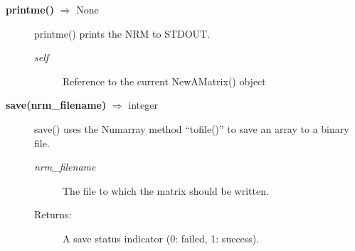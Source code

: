 \begin{description}
\item[\textbf{printme()} $\Rightarrow$ None]
printme() prints the NRM to STDOUT.
\begin{description}
\item[\emph{self}] Reference to the current NewAMatrix() object
\end{description}

\item[\textbf{save(nrm\_filename)} $\Rightarrow$ integer]
save() uses the Numarray method ``tofile()'' to save an array to a binary file.
\begin{description}
\item[\emph{nrm\_filename}] The file to which the matrix should be written.
\item[Returns:] A save status indicator (0: failed, 1: success).
\end{description}

\end{description}

